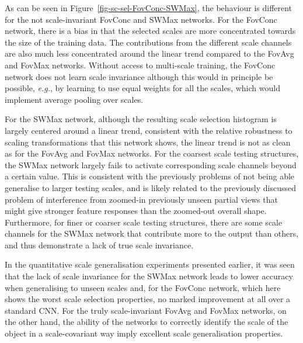 \documentclass[twocolumn,runningheads]{svjour3}
\begin{document}
As can be seen in Figure~\ref{fig-sc-sel-FovConc-SWMax},
the behaviour is different for the not scale-invariant FovConc and SWMax networks.
For the FovConc network, there is a bias in that the selected scales are
more concentrated towards the size of the training data. The contributions from
the different scale channels are also much less concentrated around the
linear trend compared to the Fov\-Avg and FovMax networks. Without access to
multi-scale training, the FovConc network does not learn scale
invariance although this would in principle be possible, {\em e.g.\/}, by learning to use equal weights for all the scales, which would implement
average pooling over scales. 

For the SWMax network, although the resulting scale selection histogram
is largely centered around a linear trend, consistent with the relative robustness to scaling transformations that this network shows, the linear trend is not as
clean as for the FovAvg and FovMax networks.
For the coarsest scale testing structures, the SWMax network largely fails to activate
corresponding scale channels beyond a certain value.
This is consistent with the previously problems of not being able generalise to larger testing scales, and is likely related to the previously discussed problem of interference from zoomed-in previously unseen
partial views that might give stronger feature responses than the zoomed-out overall shape.
Furthermore, for finer or coarser scale testing structures, there are
some scale channels for the SWMax network that contribute more to the output than others,
and thus demonstrate a lack of true scale invariance.

In the quantitative scale generalisation experiments presented earlier, it was seen that the lack of scale invariance for the SWMax network leads to lower accuracy when generalising to unseen scales and, for the FovConc network, which here shows the worst scale selection properties, no marked improvement at all over a standard CNN.  For the truly scale-invariant FovAvg and FovMax networks, on the other hand, the ability of the networks to correctly identify the scale of the object in a scale-covariant way imply 
excellent scale generalisation properties.
\end{document}
